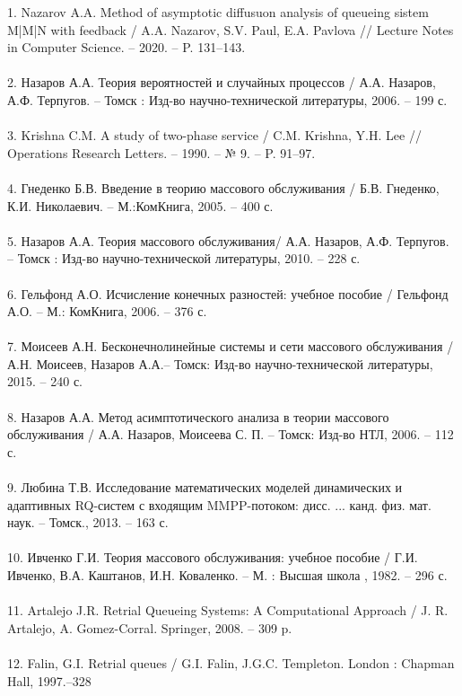 1. Nazarov A.A. Method of asymptotic diffusuon analysis of queueing sistem M|M|N with feedback / A.A. Nazarov, S.V. Paul, E.A. Pavlova // Lecture Notes in Computer Science. -- 2020. -- P. 131--143.\\
\\
2. Назаров А.А. Теория вероятностей и случайных процессов / А.А. Назаров,
А.Ф. Терпугов. -- Томск : Изд-во научно-технической литературы, 2006. --
199 с. \\
\\
3. Krishna C.M. A study of two-phase service / C.M. Krishna, Y.H. Lee  //
Operations Research Letters. -- 1990. -- № 9. -- P. 91–97.\\
\\
4. Гнеденко Б.В.  Введение в теорию массового обслуживания / Б.В. Гнеденко, К.И. Николаевич. – М.:КомКнига, 2005. – 400 с.\\
\\
5. Назаров А.А. Теория массового обслуживания/ А.А. Назаров,
А.Ф. Терпугов. -- Томск : Изд-во научно-технической литературы, 2010. --
228 с. \\
\\
6. Гельфонд А.О. Исчисление конечных разностей: учебное пособие / Гельфонд А.О. -- М.: КомКнига, 2006. -- 376 с.\\
\\
7. Моисеев А.Н. Бесконечнолинейные системы и сети массового обслуживания / А.Н. Моисеев, Назаров А.А.-- Томск: Изд-во научно-технической литературы, 2015. -- 240 с.\\
\\
8.  Назаров А.А. Метод асимптотического анализа в теории массового обслуживания / А.А. Назаров, Моисеева С. П. -- Томск: Изд-во НТЛ, 2006. -- 112 с.\\
\\
9. Любина Т.В. Исследование математических моделей динамических и адаптивных RQ-систем с входящим MMPP-потоком: дисс. ... канд. физ. мат. наук. -- Томск., 2013. -- 163 с.\\
\\
10. Ивченко Г.И. Теория массового обслуживания: учебное пособие / Г.И. Ивченко, В.А. Каштанов, И.Н. Коваленко. -- 	
М. : Высшая школа , 1982. -- 296 с.\\
\\
11. Artalejo J.R. Retrial Queueing Systems: A Computational Approach / J. R. Artalejo, A. Gomez-Corral.
Springer, 2008. -- 309 p.\\
\\
12. Falin, G.I. Retrial queues / G.I. Falin, J.G.C. Templeton. London : Chapman Hall, 1997.–328 \\
